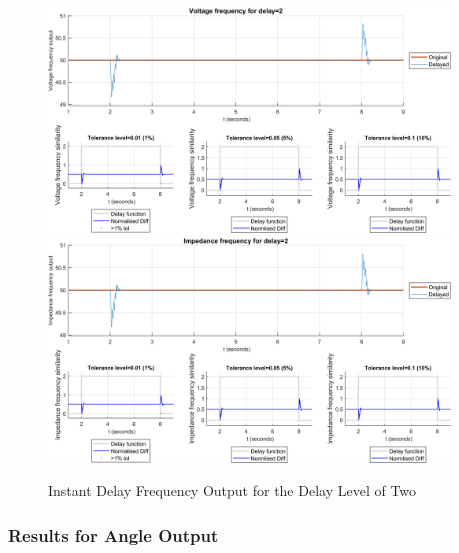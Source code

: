 \begin{figure}
    \caption{Instant Delay Frequency Output for the Delay Level of Two}
    \includegraphics[width=0.95\textwidth]{PMUsim-figures/DelayOf_2/Instant_vFrequency.png}    
    \label{fig:PMUsim_Two_vFrequency}
    \includegraphics[width=0.95\textwidth]{PMUsim-figures/DelayOf_2/Instant_iFrequency.png}    
    \label{fig:PMUsim_Two_Frequency}
        \begin{small}
     \end{small}
\end{figure}


\newpage \subsubsection{Results for Angle Output}


